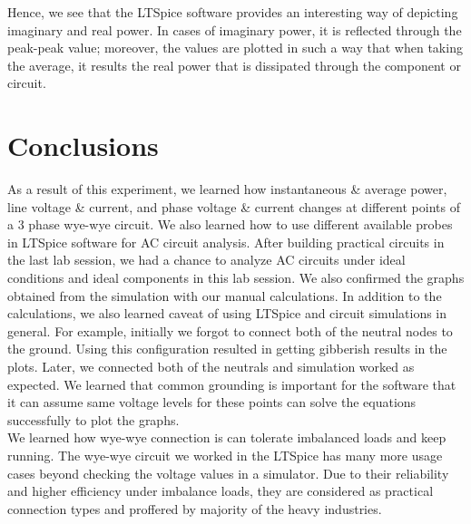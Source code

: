 \documentclass[journal]{IEEEtran}
\begin{document}
Hence, we see that the LTSpice software provides an interesting way of depicting imaginary and real power. In cases of imaginary power, it is reflected through the peak-peak value; moreover, the values are plotted in such a way that when taking the average, it results the real power that is dissipated through the component or circuit. 

\section{Conclusions}

\noindent As a result of this experiment, we learned how instantaneous \& average power, line voltage \& current, and phase voltage \& current changes at different points of a 3 phase wye-wye circuit. We also learned how to use different available probes in LTSpice software for AC circuit analysis. After building practical circuits in the last lab session, we had a chance to analyze AC circuits under ideal conditions and ideal components in this lab session. We also confirmed the graphs obtained from the simulation with our manual calculations. In addition to the calculations, we also learned caveat of using LTSpice and circuit simulations in general. For example, initially we forgot to connect both of the neutral nodes to the ground. Using this configuration resulted in getting gibberish results in the plots. Later, we connected both of the neutrals and simulation worked as expected. We learned that common grounding is important for the software that it can assume same voltage levels for these points can solve the equations successfully to plot the graphs.  
\\
\noindent We learned how wye-wye connection is can tolerate imbalanced loads and keep running. The wye-wye circuit we worked in the LTSpice has many more usage cases beyond checking the voltage values in a simulator. Due to their reliability and higher efficiency under imbalance loads, they are considered as practical connection types and proffered by majority of the heavy industries.


\printbibliography
\end{document}
